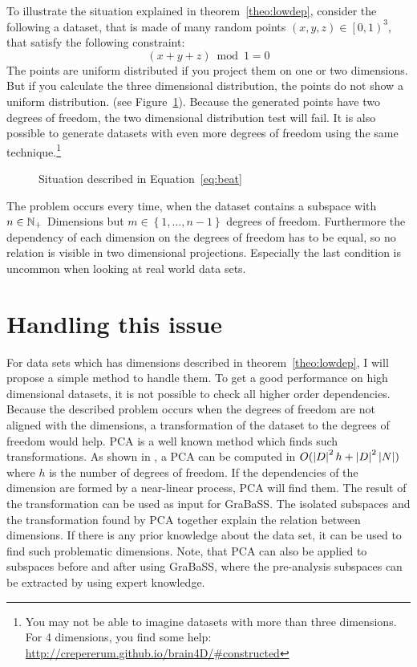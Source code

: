 To illustrate the situation explained in theorem~\ref{theo:lowdep}, consider the following a dataset, that is made of many random points $(x, y, z) \in \left[0, 1\right)^3$, that satisfy the following constraint:
\begin{equation}\label{eq:beat}
	(x + y + z) \bmod 1 = 0
\end{equation}
The points are uniform distributed if you project them on one or two dimensions. But if you calculate the three dimensional distribution, the points do not show a uniform distribution. (see Figure~\ref{fig:beat}). Because the generated points have two degrees of freedom, the two dimensional distribution test will fail. It is also possible to generate datasets with even more degrees of freedom using the same technique.\footnote{You may not be able to imagine datasets with more than three dimensions. For 4 dimensions, you find some help: \url{http://crepererum.github.io/brain4D/\#constructed}}
\begin{figure}
	\caption{Situation described in Equation~\ref{eq:beat}}
	\label{fig:beat}
	\hfill
	\hfill
	\hfill
\end{figure}

The problem occurs every time, when the dataset contains a subspace with $n \in \mathbb{N}_+$ Dimensions but $m \in \left\{1,\dots,n-1\right\}$ degrees of freedom. Furthermore the dependency of each dimension on the degrees of freedom has to be equal, so no relation is visible in two dimensional projections. Especially the last condition is uncommon when looking at real world data sets.

\section{Handling this issue}
For data sets which has dimensions described in theorem~\ref{theo:lowdep}, I will propose a simple method to handle them. To get a good performance on high dimensional datasets, it is not possible to check all higher order dependencies. Because the described problem occurs when the degrees of freedom are not aligned with the dimensions, a transformation of the dataset to the degrees of freedom would help. PCA is a well known method which finds such transformations. As shown in \cite{pca}, a PCA can be computed in $O ( \left|D\right|^2h + \left|D\right|^2\left|N\right| )$ where $h$ is the number of degrees of freedom. If the dependencies of the dimension are formed by a near-linear process, PCA will find them. The result of the transformation can be used as input for GraBaSS. The isolated subspaces and the transformation found by PCA together explain the relation between dimensions. If there is any prior knowledge about the data set, it can be used to find such problematic dimensions. Note, that PCA can also be applied to subspaces before and after using GraBaSS, where the pre-analysis subspaces can be extracted by using expert knowledge.


